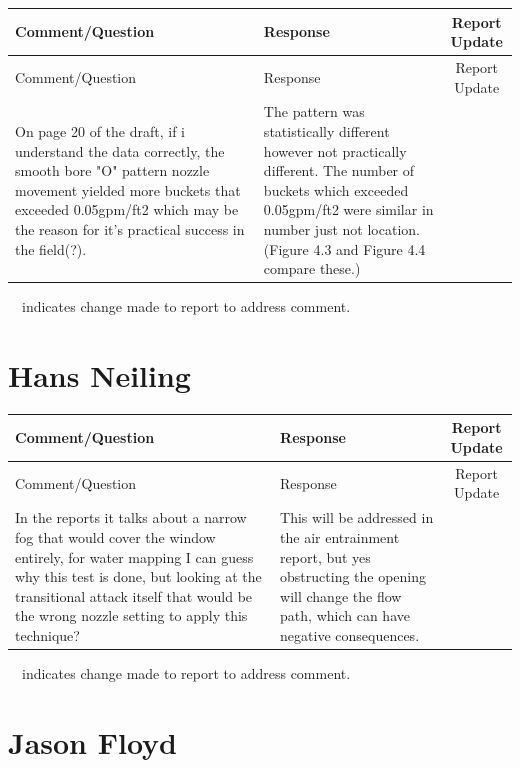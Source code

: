 \documentclass[12pt,oneside]{book}
\begin{document}
\begin{landscape}
\begin{longtable}{|L{4in}|L{3.75in}|c|}
		\hline
		Comment/Question & Response & Report Update \\ 
		\toprule[1.0pt] \endfirsthead
		\hline
		Comment/Question & Response & Report Update \\ 
		\toprule[1.0pt] \endhead
		\hline
		On page 20 of the draft, if i understand the data correctly, the smooth bore "O" pattern nozzle movement yielded more buckets that exceeded 0.05gpm/ft2 which may be the reason for it's practical success in the field(?). & 
		The pattern was statistically different however not practically different. The number of buckets which exceeded 0.05gpm/ft2 were similar in number just not location. (Figure 4.3 and Figure 4.4 compare these.) & \\
 
 		\hline
\end{longtable}
\checkmark~~indicates change made to report to address comment.

\newpage

\section{Hans Neiling}
\begin{longtable}{|L{4in}|L{3.75in}|c|}
		\hline
		Comment/Question & Response & Report Update \\ 
		\toprule[1.0pt] \endfirsthead
		\hline
		Comment/Question & Response & Report Update \\ 
		\toprule[1.0pt] \endhead
		\hline
 		In the reports it talks about a narrow fog that would cover the window entirely, for water mapping I can guess why this test is done, but looking at the transitional attack itself that would be the wrong nozzle setting to apply this technique? & 
 		This will be addressed in the air entrainment report, but yes obstructing the opening will change the flow path, which can have negative consequences.  & \\

 		\hline
\end{longtable}
\checkmark~~indicates change made to report to address comment.

\newpage

\section{Jason Floyd}
\begin{longtable}{|L{4in}|L{3.75in}|c|}


\end{longtable}
\end{landscape}
\end{document}
